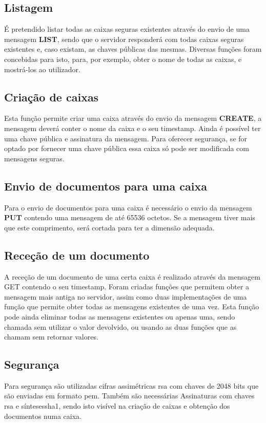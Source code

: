 \documentclass{report}
\begin{document}
\subsection{Listagem}
É pretendido listar todas as caixas seguras existentes através do envio de uma mensagem \textbf{LIST}, sendo que o servidor responderá com todas caixas seguras existentes e, caso existam, as chaves públicas das mesmas. Diversas funções foram concebidas para isto, para, por exemplo, obter o nome de todas as caixas, e mostrá-los ao utilizador.


\subsection{Criação de caixas}
Esta função permite criar uma caixa através do envio da mensagem \textbf{CREATE}, a mensagem deverá conter o nome da caixa e o seu timestamp. Ainda é possível ter uma chave pública e assinatura da mensagem. Para oferecer segurança, se for optado por fornecer uma chave pública essa caixa só pode ser modificada com mensagens seguras.


\subsection{Envio de documentos para uma caixa}
Para o envio de documentos para uma caixa é necessário o envio da mensagem \textbf{PUT} contendo uma mensagem de até 65536 octetos. Se a mensagem tiver mais que este comprimento, será cortada para ter a dimensão adequada.


\subsection{Receção de um documento}
A receção de um documento de uma certa caixa é realizado através da mensagem GET contendo o seu timestamp. Foram criadas funções que permitem obter a mensagem mais antiga no servidor, assim como duas implementações de uma função que permite obter todas as mensagens existentes de uma vez. Esta função pode ainda eliminar todas as mensagens existentes ou apenas uma, sendo chamada sem utilizar o valor devolvido, ou usando as duas funções que as chamam sem retornar valores.


\subsection{Segurança}
Para segurança são utilizadas cifras assimétricas \ac{rsa} com chaves de 2048 bits que são enviadas em formato \ac{pem}. Também são necessárias Assinaturas com chaves \ac{rsa} e sínteses{sha1}, sendo isto visível na criação de caixas e obtenção dos documentos numa caixa.
\end{document}
